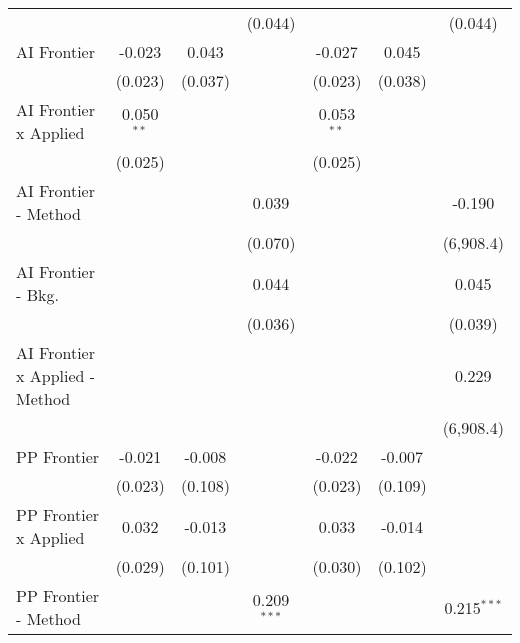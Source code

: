 \begin{tabular}{lcccccc}
                                  &                &                & (0.044)        &                &                & (0.044)\\   
   AI Frontier                    & -0.023         & 0.043          &                & -0.027         & 0.045          &   \\   
                                  & (0.023)        & (0.037)        &                & (0.023)        & (0.038)        &   \\   
   AI Frontier x Applied          & 0.050$^{**}$   &                &                & 0.053$^{**}$   &                &   \\   
                                  & (0.025)        &                &                & (0.025)        &                &   \\   
   AI Frontier - Method           &                &                & 0.039          &                &                & -0.190\\   
                                  &                &                & (0.070)        &                &                & (6,908.4)\\   
   AI Frontier - Bkg.             &                &                & 0.044          &                &                & 0.045\\   
                                  &                &                & (0.036)        &                &                & (0.039)\\   
   AI Frontier x Applied - Method &                &                &                &                &                & 0.229\\   
                                  &                &                &                &                &                & (6,908.4)\\   
   PP Frontier                    & -0.021         & -0.008         &                & -0.022         & -0.007         &   \\   
                                  & (0.023)        & (0.108)        &                & (0.023)        & (0.109)        &   \\   
   PP Frontier x Applied          & 0.032          & -0.013         &                & 0.033          & -0.014         &   \\   
                                  & (0.029)        & (0.101)        &                & (0.030)        & (0.102)        &   \\   
   PP Frontier - Method           &                &                & 0.209$^{***}$  &                &                & 0.215$^{***}$\\   

\end{tabular}
